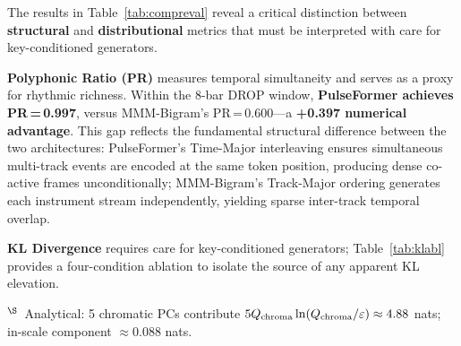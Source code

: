 \documentclass[conference]{IEEEtran}
\begin{document}
The results in Table~\ref{tab:compreval} reveal a critical distinction between \textbf{structural} and
\textbf{distributional} metrics that must be interpreted with care for
key-conditioned generators.

\textbf{Polyphonic Ratio (PR)} measures temporal simultaneity and serves as
a proxy for rhythmic richness. Within the 8-bar DROP window,
\textbf{PulseFormer achieves PR\,=\,0.997}, versus MMM-Bigram's
PR\,=\,0.600---a \textbf{+0.397 numerical advantage}.
This gap reflects the fundamental structural difference between the two
architectures: PulseFormer's Time-Major interleaving ensures simultaneous
multi-track events are encoded at the same token position, producing dense
co-active frames unconditionally; MMM-Bigram's Track-Major ordering
generates each instrument stream independently, yielding sparse inter-track
temporal overlap. 

\textbf{KL Divergence} requires care for key-conditioned generators;
Table~\ref{tab:klabl} provides a four-condition ablation to isolate the
source of any apparent KL elevation.

\begin{table}[ht]
\centering\small
\caption{KL divergence ablation: isolating the Harmonic Mask contribution.
  $D_{\rm KL}(\text{Ref}\|\text{System})$ vs.\ training-data reference (nats).
  In-scale KL: 7 C-minor PCs renormalised;
  no-mask: chromatic PCs restored to prior.}
\label{tab:klabl}
\vspace{2pt}
{\scriptsize
$^{\S}$~Analytical: 5 chromatic PCs contribute $5Q_{\rm chroma}\ln(Q_{\rm chroma}/\varepsilon)\approx4.88$ nats;
in-scale component $\approx0.088$ nats.}
\end{table}
\end{document}
